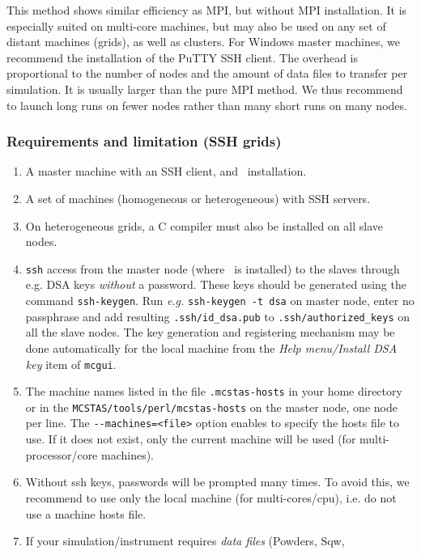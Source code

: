 This method shows similar efficiency as MPI, but without MPI installation. It is
especially suited on multi-core machines, but may also be used on any set of
distant machines (grids), as well as clusters. For Windows master machines, we
recommend the installation of the PuTTY SSH client. The overhead is proportional
to the number of nodes and the amount of data files to transfer per
simulation. It is usually larger than the pure MPI method. We thus recommend to
launch long runs on fewer nodes rather than many short runs on many nodes.

\subsubsection{Requirements and limitation (SSH grids)}

  \begin{enumerate}
  \item{A master machine with an SSH client, and \MCS\ installation.}
  \item{A set of machines (homogeneous or heterogeneous) with SSH servers.}
  \item{On heterogeneous grids, a C compiler must also be installed on all slave
      nodes.}
  \item{\texttt{ssh} access from the master node (where \MCS\ is
      installed) to the slaves through e.g. DSA keys \emph{without} a
      password. These keys should be generated using the command
      \texttt{ssh-keygen}. Run \emph{e.g.} \texttt{ssh-keygen -t dsa} on
      master node, enter no passphrase and add resulting
      \texttt{.ssh/id\_dsa.pub} to \texttt{.ssh/authorized\_keys}
      on all the slave nodes. The key generation and registering mechanism
      may be done automatically for the local machine from the
      \emph{Help menu/Install DSA key} item of \verb+mcgui+.}
  \item{The machine names listed in the file \texttt{.mcstas-hosts} in
      your home directory or in the \texttt{MCSTAS/tools/perl/mcstas-hosts} on
      the master node, one node per line. The \verb'--machines=<file>' option
      enables to specify the hosts file to use. If it does not exist, only
      the current machine will be used (for multi-processor/core machines).}
  \item{Without ssh keys, passwords will be prompted many times. To avoid this,
      we recommend to use only the local machine (for multi-cores/cpu), i.e. do
      not use a machine hosts file.}
  \item{If your simulation/instrument requires \emph{data files} (Powders, Sqw,
}
\end{enumerate}
